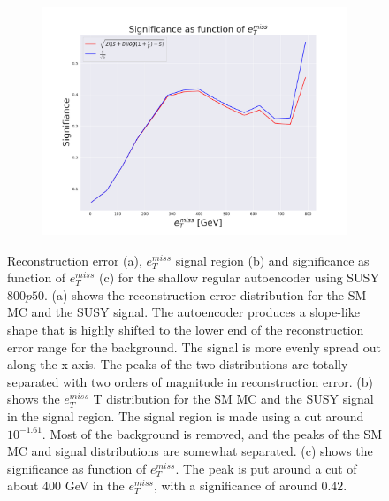 \begin{figure}[h!]
    \hfill  
    \begin{subfigure}{.49\textwidth}
        \includegraphics[width=\textwidth]{Figures/AE_testing/small/2lep/significance_etmiss_800p0p050_-1.6117055611472277.pdf}
        \caption{}
        \label{fig:AE_2lep_small_signi_800}
    \end{subfigure}
    \hfill      
    \caption[2lep shallow network | $800p50$ | AE]{Reconstruction error (a), $e_T^{miss}$ signal region (b) and significance as function of 
    $e_T^{miss}$ (c) for the shallow regular autoencoder using SUSY $800p50$. 
    (a) shows the reconstruction error distribution for the SM MC and the SUSY signal. 
    The autoencoder produces a slope-like shape that is highly shifted to the lower end of the reconstruction error range
for the background. The signal is more evenly spread out along the x-axis. The peaks of the two distributions are totally separated
with two orders of magnitude in reconstruction error. (b) shows the $e_T^{miss}$
T distribution for the SM MC and the SUSY signal in the signal region. The signal region is made using a cut around
$10^{-1.61}$. Most of the background is removed, and the peaks of the SM MC and signal distributions are
somewhat separated. (c) shows the significance as function of $e_T^{miss}$. The peak is put 
around a cut of about 400 GeV in the $e_T^{miss}$, with a significance of around $0.42$.}
    \label{fig:AE_2lep_small_rec_sig_signi_800}
\end{figure}


